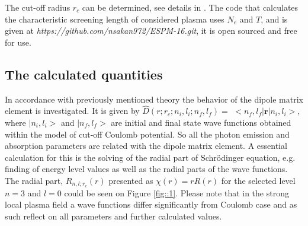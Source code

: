 \documentclass[a1]{sciposter}
\begin{document}
\begin{multicols}{3}
{\noindent The cut-off radius $r_{c}$ can be determined, see details in \cite{mih09b}. The code that calculates the characteristic screening length of considered plasma uses $N_{e}$ and $T$, and is given at {\it https://github.com/nsakan972/ESPM-16.git}, it is open sourced and free for use.}

\subsection{The calculated quantities}

In accordance with previously mentioned theory the behavior of the dipole matrix element is investigated. It is given by  $\hat{D}(r;r_{c};n_i,l_i;n_f,l_f) = $ $<n_f,l_f| {\mathbf r} |n_i,l_i>$,
where $|n_i,l_i>$ and $|n_f,l_f>$ are initial and final state wave functions obtained within the model of cut-off Coulomb potential. So all the photon emission and absorption parameters are related with the dipole matrix element. A essential calculation for this is the solving of the radial part of  Schr{\" o}dinger equation, e.g. finding of energy level values as well as the radial parts of the wave functions. The radial part, $R_{n,l;r_c}(r)$ presented as $\chi (r) = r R(r)$ for the selected level $n=3$ and $l = 0$ could be seen on Figure \ref{fig::1}. Please note that in the strong local plasma field a wave functions differ significantly from Coulomb case and as such reflect on all parameters and further calculated values.



\end{multicols}
\end{document}
